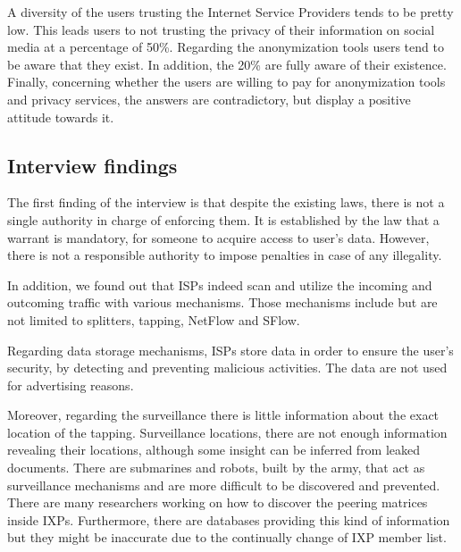 A diversity of the users trusting the Internet Service Providers tends to be 
pretty low. This leads users to not trusting the privacy of their information on 
social media at a percentage of 50\%. Regarding the anonymization tools users 
tend to be aware that they exist. In addition, the 20\% are fully aware of their 
existence. Finally, concerning whether the users are willing to pay for 
anonymization tools and privacy services, the answers are contradictory, but 
display a positive attitude towards it.

\subsection{Interview findings}

The first finding of the interview is that despite the existing laws, there is 
not a single authority in charge of enforcing them. It is established by the law 
that a warrant is mandatory, for someone to acquire access to  user's data. 
However, there is not a responsible authority to impose penalties in case of any 
illegality.

In addition, we found out that ISPs indeed scan and utilize the incoming and 
outcoming traffic with various mechanisms. Those mechanisms include but are not 
limited to splitters, tapping, NetFlow and SFlow.

Regarding data storage mechanisms, ISPs store data in order to ensure the user's 
security, by detecting and preventing malicious activities. The data are not 
used for advertising reasons.

Moreover, regarding the surveillance there is little information about the exact 
location of the tapping. Surveillance locations, there are not enough 
information revealing their locations, although some insight can be inferred 
from leaked documents. There are submarines and robots, built by the army, that 
act as surveillance mechanisms and are more difficult to be discovered and 
prevented.  There are many researchers working on how to discover the peering 
matrices inside IXPs. Furthermore, there are databases providing this kind of 
information but they might be inaccurate due to the continually change of IXP 
member list.

